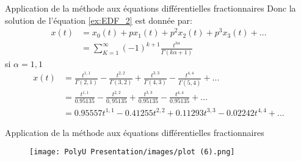 \documentclass{sintefbeamer}
\begin{document}
\begin{frame}{Application de la méthode aux équations différentielles fractionnaires}
    Donc la solution de l'équation \ref{ex:EDF_2} est donnée par:
\begin{align*}
        x(t) &= x_0(t) + px_1(t) + p^2x_2(t) + p^3x_3(t)+...\\
        &= \sum_{K=1}^{\infty}(-1)^{k+1}\frac{t^{k\alpha}}{\Gamma(k\alpha +1)}
\end{align*}
si $\alpha = 1,1$
\begin{align*}
    x(t) &= \frac{t^{1,1}}{\Gamma(2,1)} - \frac{t^{2,2}}{\Gamma(3,2)} +\frac{t^{3,3}}{\Gamma(4,3)} - \frac{t^{4,4}}{\Gamma(5,4)}+...\\
    &= \frac{t^{1,1}}{0.95135} - \frac{t^{2,2}}{0,95135} +\frac{t^{3,3}}{0.95135} - \frac{t^{4,4}}{0.95135}+...\\
    & = 0.95557t^{1,1} - 0.41255t^{2,2} + 0.11293t^{3,3}- 0.02242 t^{4,4} + ...
\end{align*}
\end{frame}

\begin{frame}{Application de la méthode aux équations différentielles fractionnaires}
    \begin{figure}[H]
    \centering
    \texttt{[image: PolyU Presentation/images/plot (6).png]}
\end{figure}
\end{frame}
\end{document}
